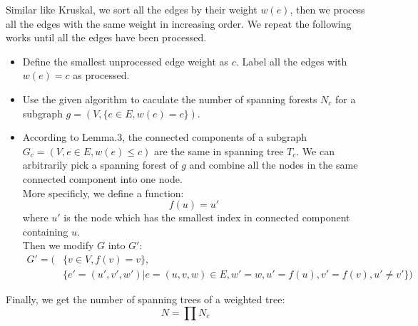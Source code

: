 Similar like Kruskal, we sort all the edges by their weight $w(e)$, then we process all the edges with the same weight in increasing order. We repeat the following works until all the edges have been processed.
\begin{itemize}
	\item Define the smallest unprocessed edge weight as $c$. Label all the edges with $w(e)=c$ as processed.
	\item Use the given algorithm to caculate the number of spanning forests $N_c$ for a subgraph $g=(V,\{e\in E,w(e)=c\})$.
	\item According to Lemma.3, the connected components of a subgraph $G_c=(V,{e\in E,w(e)\leq c})$ are the same in spanning tree $T_c$. We can arbitrarily pick a spanning forest of $g$ and combine all the nodes in the same connected component into one node.\\
	More specificly, we define a function: $$f(u)=u'$$ where $u'$ is the node which has the smallest index in connected component containing $u$.\\ Then we modify $G$ into $G'$:
	\begin{align*}
		G'=(&\{v\in V,f(v)=v\},\\
		&\{e'=(u',v',w')|e=(u,v,w)\in E,w'=w,u'=f(u),v'=f(v),u'\neq v'\})
	\end{align*}
\end{itemize}
Finally, we get the number of spanning trees of a weighted tree:
$$N=\prod N_c$$
